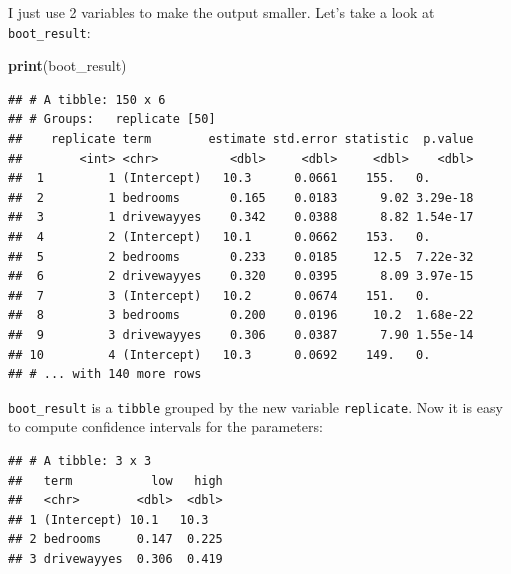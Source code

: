 \documentclass[]{gitbook}
\newenvironment{Shaded}{\begin{snugshade}}{\end{snugshade}}
\newcommand{\DataTypeTok}[1]{\textcolor[rgb]{0.13,0.29,0.53}{#1}}
\newcommand{\DecValTok}[1]{\textcolor[rgb]{0.00,0.00,0.81}{#1}}
\newcommand{\FloatTok}[1]{\textcolor[rgb]{0.00,0.00,0.81}{#1}}
\newcommand{\KeywordTok}[1]{\textcolor[rgb]{0.13,0.29,0.53}{\textbf{#1}}}
\newcommand{\NormalTok}[1]{#1}
\newcommand{\OperatorTok}[1]{\textcolor[rgb]{0.81,0.36,0.00}{\textbf{#1}}}
\newcommand{\StringTok}[1]{\textcolor[rgb]{0.31,0.60,0.02}{#1}}
\theoremstyle{definition}
\theoremstyle{definition}
\theoremstyle{definition}
\theoremstyle{remark}
\begin{document}
I just use 2 variables to make the output smaller. Let's take a look at
\texttt{boot\_result}:

\begin{Shaded}
\begin{Highlighting}[]
\KeywordTok{print}\NormalTok{(boot_result)}
\end{Highlighting}
\end{Shaded}

\begin{verbatim}
## # A tibble: 150 x 6
## # Groups:   replicate [50]
##    replicate term        estimate std.error statistic  p.value
##        <int> <chr>          <dbl>     <dbl>     <dbl>    <dbl>
##  1         1 (Intercept)   10.3      0.0661    155.   0.      
##  2         1 bedrooms       0.165    0.0183      9.02 3.29e-18
##  3         1 drivewayyes    0.342    0.0388      8.82 1.54e-17
##  4         2 (Intercept)   10.1      0.0662    153.   0.      
##  5         2 bedrooms       0.233    0.0185     12.5  7.22e-32
##  6         2 drivewayyes    0.320    0.0395      8.09 3.97e-15
##  7         3 (Intercept)   10.2      0.0674    151.   0.      
##  8         3 bedrooms       0.200    0.0196     10.2  1.68e-22
##  9         3 drivewayyes    0.306    0.0387      7.90 1.55e-14
## 10         4 (Intercept)   10.3      0.0692    149.   0.      
## # ... with 140 more rows
\end{verbatim}

\texttt{boot\_result} is a \texttt{tibble} grouped by the new variable
\texttt{replicate}. Now it is easy to compute confidence intervals for
the parameters:

\begin{Shaded}
\end{Shaded}

\begin{verbatim}
## # A tibble: 3 x 3
##   term           low   high
##   <chr>        <dbl>  <dbl>
## 1 (Intercept) 10.1   10.3  
## 2 bedrooms     0.147  0.225
## 3 drivewayyes  0.306  0.419
\end{verbatim}
\end{document}
